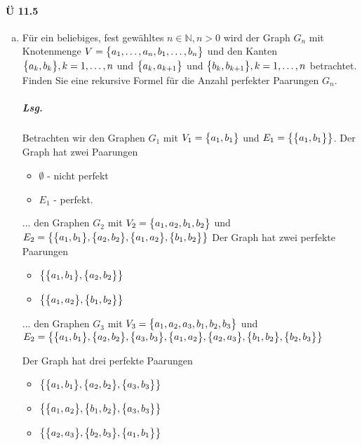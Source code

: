 \documentclass{scrreprt}
\begin{document}
\paragraph{Ü 11.5}
\begin{enumerate}[(a)]
\item Für ein beliebiges, fest gewähltes $n \in \mathbb{N}, n > 0$ wird der Graph
  $G_n$ mit Knotenmenge $V = \qty\big{a_1, \ldots, a_n, b_1, \ldots, b_n}$ und
  den Kanten $\qty\big{a_k, b_k}, k = 1, \ldots, n$ und
  $\qty\big{a_k, a_{k + 1}}$ und $\qty\big{b_k, b_{k + 1}}, k = 1, \ldots, n$
  betrachtet.
  Finden Sie eine rekursive Formel für die Anzahl perfekter Paarungen $G_n$.

  \subparagraph{Lsg.} Betrachten wir den Graphen $G_1$ mit
  $V_1 = \qty\big{a_1, b_1}$ und $E_1 = \qty{\qty\big{a_1, b_1}}$.
  Der Graph hat zwei Paarungen
  \begin{itemize}
  \item $\emptyset$ - nicht perfekt
  \item $E_1$ - perfekt.
  \end{itemize}

  ... den Graphen $G_2$ mit $V_2 = \qty\big{a_1, a_2, b_1, b_2}$ und
  $E_2 = \qty{
    \qty\big{a_1, b_1},
    \qty\big{a_2, b_2},
    \qty\big{a_1, a_2},
    \qty\big{b_1, b_2}
  }$
  Der Graph hat zwei perfekte Paarungen
  \begin{itemize}
  \item $\qty{\qty\big{a_1, b_1}, \qty\big{a_2, b_2}}$
  \item $\qty{\qty\big{a_1, a_2}, \qty\big{b_1, b_2}}$
  \end{itemize}

  ... den Graphen $G_3$ mit $V_3 = \qty\big{a_1, a_2, a_3, b_1, b_2, b_3}$ und \\
  $E_2 = \qty{
    \qty\big{a_1, b_1},
    \qty\big{a_2, b_2},
    \qty\big{a_3, b_3},
    \qty\big{a_1, a_2},
    \qty\big{a_2, a_3},
    \qty\big{b_1, b_2},
    \qty\big{b_2, b_3}
  }$

  Der Graph hat drei perfekte Paarungen
  \begin{itemize}
  \item $\qty{\qty\big{a_1, b_1}, \qty\big{a_2, b_2}, \qty\big{a_3, b_3}}$
  \item $\qty{\qty\big{a_1, a_2}, \qty\big{b_1, b_2}, \qty\big{a_3, b_3}}$
  \item $\qty{\qty\big{a_2, a_3}, \qty\big{b_2, b_3}, \qty\big{a_1, b_1}}$
  \end{itemize}


\end{enumerate}
\end{document}
